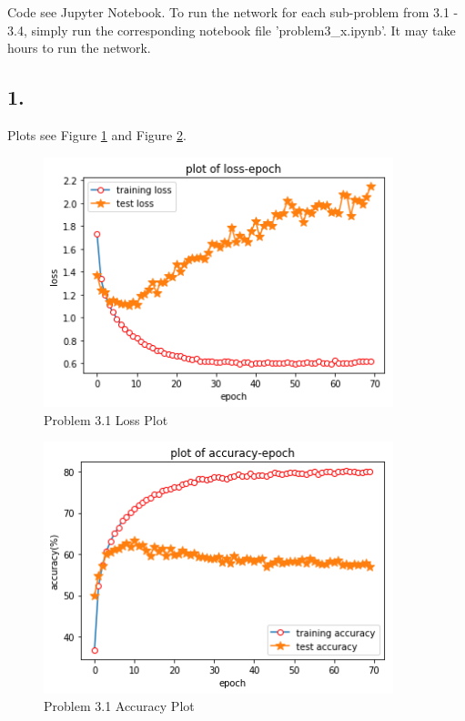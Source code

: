 \documentclass[twoside,12pt]{homework}
\begin{document}
Code see Jupyter Notebook. To run the network for each sub-problem from 3.1 - 3.4, simply run the corresponding notebook file 'problem3\_x.ipynb'. It may take hours to run the network.

\subsection*{1.}

Plots see Figure \ref{fig1} and Figure \ref{fig2}.

\begin{figure}[!htb]
\begin{center}
\includegraphics[width=4in]{Unknown-1.png}
\caption{Problem 3.1 Loss Plot}
\label{fig1}
\end{center}
\end{figure}

\begin{figure}[!htb]
\begin{center}
\includegraphics[width=4in]{Unknown-2.png}
\caption{Problem 3.1 Accuracy Plot}
\label{fig2}
\end{center}
\end{figure}
\end{document}
